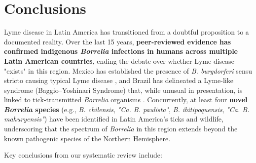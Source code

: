 \documentclass[11pt,letterpaper]{article}
\begin{document}
\section{Conclusions}
Lyme disease in Latin America has transitioned from a doubtful proposition to a documented reality. Over the last 15 years, \textbf{peer-reviewed evidence has confirmed indigenous \textit{Borrelia} infections in humans across multiple Latin American countries}, ending the debate over whether Lyme disease "exists" in this region. Mexico has established the presence of \textit{B. burgdorferi} sensu stricto causing typical Lyme disease \citep{Colunga-Salas2020q}, and Brazil has delineated a Lyme-like syndrome (Baggio–Yoshinari Syndrome) that, while unusual in presentation, is linked to tick-transmitted \textit{Borrelia} organisms \citep{Yoshinari2022an, Yoshinari2022ao}. Concurrently, at least four \textbf{novel \textit{Borrelia} species} (e.g., \textit{B. chilensis}, \textit{"Ca. B. paulista"}, \textit{B. ibitipoquensis}, \textit{"Ca. B. mahuryensis"}) have been identified in Latin America's ticks and wildlife, underscoring that the spectrum of \textit{Borrelia} in this region extends beyond the known pathogenic species of the Northern Hemisphere.

Key conclusions from our systematic review include:
\end{document}
